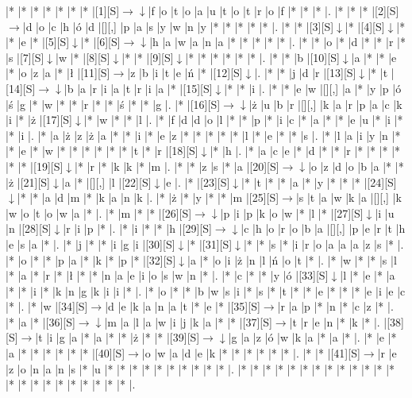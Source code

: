\documentclass[11pt]{article}
\newcommand\drarr{$\rightarrow \!\!\!\!\! \downarrow$}
\newcommand\rarr{$\rightarrow$}
\newcommand\darr{$\downarrow$}
\begin{document}
\noindent\begin{Puzzle}{22}{27}|*	|*	|*	|*	|*	|*	|*	|[1][S]\drarr	|f	|o	|t	|o	|a	|u	|t	|o	|t	|r	|o	|f	|*	|*	|*	|.
|*	|*	|*	|[2][S]\rarr	|d	|o	|c	|h	|ó	|d	|[][,]{ }	|p	|a	|s	|y	|w	|n	|y	|*	|*	|*	|*	|*	|.
|*	|*	|[3][S]\darr	|*	|[4][S]\darr	|*	|*	|e	|*	|[5][S]\darr	|*	|[6][S]\drarr	|h	|a	|w	|a	|n	|a	|*	|*	|*	|*	|*	|.
|*	|*	|o	|*	|d	|*	|*	|r	|*	|s	|[7][S]\darr	|w	|*	|[8][S]\darr	|*	|*	|[9][S]\darr	|*	|*	|*	|*	|*	|*	|.
|*	|*	|b	|[10][S]\darr	|a	|*	|*	|e	|*	|o	|z	|a	|*	|ł	|[11][S]\rarr	|z	|b	|i	|t	|e	|ń	|*	|[12][S]\darr	|.
|*	|*	|j	|d	|r	|[13][S]\darr	|*	|t	|[14][S]\drarr	|b	|a	|r	|i	|a	|t	|r	|i	|a	|*	|[15][S]\darr	|*	|*	|i	|.
|*	|*	|e	|w	|[][,]{ }	|a	|*	|y	|p	|ó	|ś	|g	|*	|w	|*	|*	|r	|*	|*	|ś	|*	|*	|g	|.
|*	|[16][S]\drarr	|ż	|u	|b	|r	|[][,]{ }	|k	|a	|r	|p	|a	|c	|k	|i	|*	|ż	|[17][S]\darr	|*	|w	|*	|*	|l	|.
|*	|f	|d	|d	|o	|l	|*	|*	|p	|*	|i	|c	|*	|a	|*	|*	|e	|u	|*	|i	|*	|*	|i	|.
|*	|a	|ż	|z	|ż	|a	|*	|*	|i	|*	|e	|z	|*	|*	|*	|*	|*	|l	|*	|e	|*	|*	|s	|.
|*	|l	|a	|i	|y	|n	|*	|*	|e	|*	|w	|*	|*	|*	|*	|*	|*	|t	|*	|r	|[18][S]\darr	|*	|h	|.
|*	|a	|c	|e	|*	|d	|*	|*	|r	|*	|*	|*	|*	|*	|*	|[19][S]\darr	|*	|r	|*	|k	|k	|*	|m	|.
|*	|*	|z	|s	|*	|a	|[20][S]\drarr	|o	|z	|d	|o	|b	|a	|*	|*	|ż	|[21][S]\darr	|a	|*	|[][,]{ }	|l	|[22][S]\darr	|e	|.
|*	|[23][S]\darr	|*	|t	|*	|*	|a	|*	|y	|*	|*	|*	|[24][S]\darr	|*	|*	|a	|d	|m	|*	|k	|a	|n	|k	|.
|*	|ż	|*	|y	|*	|*	|m	|[25][S]\rarr	|s	|t	|a	|w	|k	|a	|[][,]{ }	|k	|w	|o	|t	|o	|w	|a	|*	|.
|*	|m	|*	|*	|[26][S]\drarr	|p	|i	|p	|k	|o	|w	|*	|l	|*	|[27][S]\darr	|i	|u	|n	|[28][S]\darr	|r	|i	|p	|*	|.
|*	|i	|*	|*	|h	|[29][S]\drarr	|c	|h	|o	|r	|o	|b	|a	|[][,]{ }	|p	|e	|r	|t	|h	|e	|s	|a	|*	|.
|*	|j	|*	|*	|i	|g	|i	|[30][S]\darr	|*	|[31][S]\darr	|*	|*	|s	|*	|i	|r	|o	|a	|a	|a	|z	|s	|*	|.
|*	|o	|*	|*	|p	|a	|*	|k	|*	|p	|*	|[32][S]\darr	|a	|*	|o	|i	|ż	|n	|l	|ń	|o	|t	|*	|.
|*	|w	|*	|*	|s	|l	|*	|a	|*	|r	|*	|ł	|*	|*	|n	|a	|e	|i	|o	|s	|w	|n	|*	|.
|*	|c	|*	|*	|y	|ó	|[33][S]\darr	|l	|*	|e	|*	|a	|*	|*	|i	|*	|k	|n	|g	|k	|i	|i	|*	|.
|*	|o	|*	|*	|b	|w	|s	|i	|*	|s	|*	|t	|*	|*	|e	|*	|*	|*	|e	|i	|e	|c	|*	|.
|*	|w	|[34][S]\rarr	|d	|e	|k	|a	|n	|a	|t	|*	|e	|*	|[35][S]\rarr	|r	|a	|p	|*	|n	|*	|c	|z	|*	|.
|*	|a	|*	|[36][S]\drarr	|m	|a	|l	|a	|w	|i	|j	|k	|a	|*	|*	|[37][S]\rarr	|t	|r	|e	|n	|*	|k	|*	|.
|[38][S]\rarr	|t	|i	|g	|a	|*	|a	|*	|*	|ż	|*	|*	|[39][S]\drarr	|g	|a	|z	|ó	|w	|k	|a	|*	|a	|*	|.
|*	|e	|*	|a	|*	|*	|*	|*	|*	|*	|[40][S]\rarr	|o	|w	|a	|d	|e	|k	|*	|*	|*	|*	|*	|*	|.
|*	|*	|[41][S]\rarr	|r	|e	|z	|o	|n	|a	|n	|s	|*	|u	|*	|*	|*	|*	|*	|*	|*	|*	|*	|*	|.
|*	|*	|*	|*	|*	|*	|*	|*	|*	|*	|*	|*	|*	|*	|*	|*	|*	|*	|*	|*	|*	|*	|*	|.\end{Puzzle}
\end{document}
